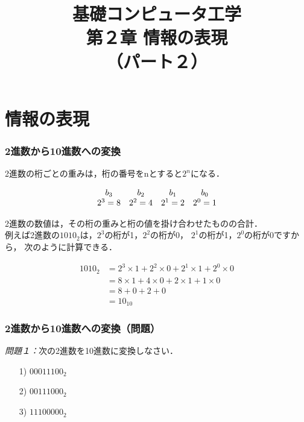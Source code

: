 \documentclass{beamer}                 %
\begin{document}
\title{基礎コンピュータ工学\\第２章 情報の表現\\（パート２）}
\date{}

\begin{frame}
  \titlepage
\end{frame}


\section{情報の表現}
\begin{frame}
  \frametitle{2進数から10進数への変換}
  2進数の桁ごとの重みは，桁の番号をnとすると$2^n$になる．

\[
\begin{array}{c c c c c }
b_3     & b_2     & b_1     & b_0     \\
2^3 = 8 & 2^2 = 4 & 2^1 = 2 & 2^0 = 1 \\
\end{array}
\]

2進数の数値は，その桁の重みと桁の値を掛け合わせたものの合計．\\
例えば2進数の$1010_2$は，$2^3$の桁が1，$2^2$の桁が0，
$2^1$の桁が1，$2^0$の桁が0ですから，
次のように計算できる．

\begin{align*}
1010_2 &= 2^3 \times 1 + 2^2 \times 0 + 2^1 \times 1 + 2^0 \times 0 \\
       &= 8 \times 1 + 4 \times 0 + 2 \times 1 + 1 \times 0 \\
       &= 8 + 0 + 2 + 0 \\
       &= 10_{10}
\end{align*}
\end{frame}

\begin{frame}
  \frametitle{2進数から10進数への変換（問題）}

\emph{問題１：}次の2進数を10進数に変換しなさい．
\begin{enumerate}
\item[1)] $0001 1100_2$
\vfill
\item[2)] $0011 1000_2$
\vfill
\item[3)] $1110 0000_2$
\vfill
\end{enumerate}
\end{frame}
\end{document}
